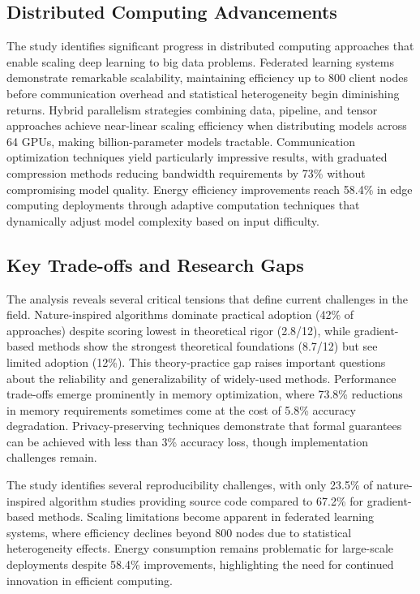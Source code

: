 \documentclass[acmsmall]{acmart}
\begin{document}
\subsection{Distributed Computing Advancements}
The study identifies significant progress in distributed computing approaches that enable scaling deep learning to big data problems. Federated learning systems demonstrate remarkable scalability, maintaining efficiency up to 800 client nodes before communication overhead and statistical heterogeneity begin diminishing returns. Hybrid parallelism strategies combining data, pipeline, and tensor approaches achieve near-linear scaling efficiency when distributing models across 64 GPUs, making billion-parameter models tractable. Communication optimization techniques yield particularly impressive results, with graduated compression methods reducing bandwidth requirements by 73\% without compromising model quality. Energy efficiency improvements reach 58.4\% in edge computing deployments through adaptive computation techniques that dynamically adjust model complexity based on input difficulty.

\subsection{Key Trade-offs and Research Gaps}
The analysis reveals several critical tensions that define current challenges in the field. Nature-inspired algorithms dominate practical adoption (42\% of approaches) despite scoring lowest in theoretical rigor (2.8/12), while gradient-based methods show the strongest theoretical foundations (8.7/12) but see limited adoption (12\%). This theory-practice gap raises important questions about the reliability and generalizability of widely-used methods. Performance trade-offs emerge prominently in memory optimization, where 73.8\% reductions in memory requirements sometimes come at the cost of 5.8\% accuracy degradation. Privacy-preserving techniques demonstrate that formal guarantees can be achieved with less than 3\% accuracy loss, though implementation challenges remain.

The study identifies several reproducibility challenges, with only 23.5\% of nature-inspired algorithm studies providing source code compared to 67.2\% for gradient-based methods. Scaling limitations become apparent in federated learning systems, where efficiency declines beyond 800 nodes due to statistical heterogeneity effects. Energy consumption remains problematic for large-scale deployments despite 58.4\% improvements, highlighting the need for continued innovation in efficient computing.
\end{document}
